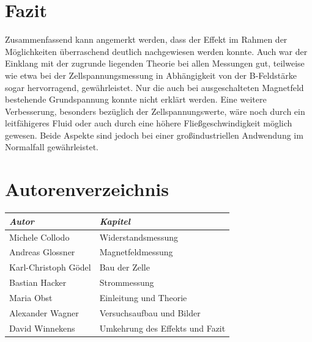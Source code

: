 \documentclass[11pt]{scrartcl}
\begin{document}
\section{Fazit}		%
Zusammenfassend kann angemerkt werden, dass der Effekt im Rahmen der Möglichkeiten überraschend deutlich nachgewiesen werden konnte. Auch war der Einklang mit der zugrunde liegenden Theorie bei allen Messungen gut, teilweise wie etwa bei der Zellspannungsmessung in Abhängigkeit von der B-Feldstärke sogar hervorragend, gewährleistet. Nur die auch bei ausgeschalteten Magnetfeld bestehende Grundspannung konnte nicht erklärt werden. Eine weitere Verbesserung, besonders bezüglich der Zellspannungswerte, wäre noch durch ein leitfähigeres Fluid oder auch durch eine höhere Fließgeschwindigkeit möglich gewesen. Beide Aspekte sind jedoch bei einer großindustriellen Andwendung im Normalfall gewährleistet.





\newpage
\section{Autorenverzeichnis}
\begin{tabular}{|l|l|}
\hline
\emph{Autor} & \emph{Kapitel}\\
\hline
Michele Collodo & Widerstandsmessung\\
Andreas Glossner & Magnetfeldmessung\\
Karl-Christoph G\"odel & Bau der Zelle\\
Bastian Hacker & Strommessung\\
Maria Obst & Einleitung und Theorie\\
Alexander Wagner & Versuchsaufbau und Bilder\\
David Winnekens & Umkehrung des Effekts und Fazit\\
\hline
\end{tabular}
\end{document}
